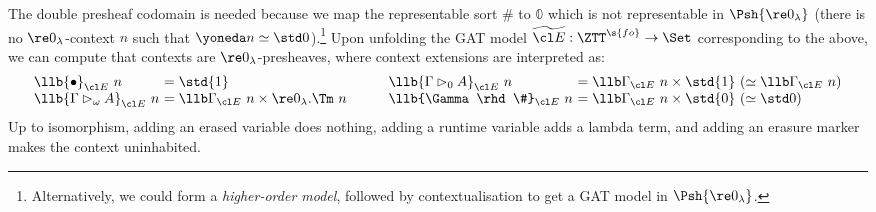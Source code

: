 \documentclass[a4paper,UKenglish,cleveref,autoref,thm-restate]{lipics-v2021}
\begin{document}
The double presheaf codomain is needed because we map the representable sort
$\#$ to $\mathbb{0}$ which is not representable in $\Psh{\re 0_\lambda}$ (there
is no $\re 0_\lambda$-context $n$ such that $\yoneda n \simeq \std 0$).\footnote{Alternatively, we could form a
\emph{higher-order model}, followed by contextualisation \cite{Bocquet2023-bu}
to get a GAT model in $\Psh{\re 0 _\lambda}$.} Upon unfolding the GAT model
$\widetilde{\cl E} : \ZTT^{\s{fo}} \to \Set$ corresponding to the
above, we can compute that contexts are ${\re 0_\lambda}$-presheaves, where
context extensions are interpreted as:
\[\begin{array}{c@{\qquad}c}
  \begin{array}{l@{\ }l}
    \llb{\bullet}_{\cl E}\ n & = \std{1}  \\
    \llb{\Gamma \rhd_\omega A}_{\cl E}\ n & = \llb\Gamma_{\cl E}\ n \times {\re 0_\lambda}.\Tm\ n
  \end{array}
  &
  \begin{array}{l@{\ }l}
    \llb{\Gamma \rhd_0 A}_{\cl E}\ n & = \llb\Gamma_{\cl E}\ n \times \std{1}\ (\simeq \llb\Gamma_{\cl E}\ n) \\
    \llb{\Gamma \rhd \#}_{\cl E}\ n & = \llb\Gamma_{\cl E}\ n \times \std{0}\ (\simeq \std 0)
  \end{array}
\end{array}\]
Up to isomorphism, adding an erased variable does nothing, adding a runtime
variable adds a lambda term, and adding an erasure marker makes the context
uninhabited.
  
\end{document}
